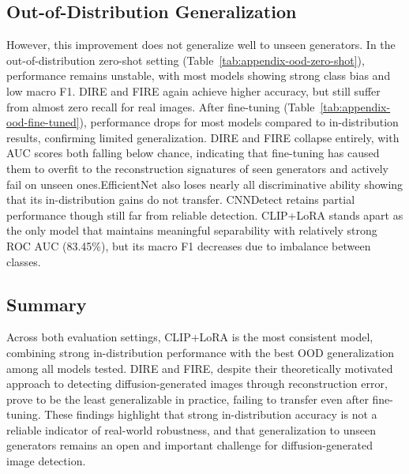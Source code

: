 \subsection{Out-of-Distribution Generalization}
However, this improvement does not generalize well to unseen generators. In the out-of-distribution zero-shot setting (Table~\ref{tab:appendix-ood-zero-shot}), performance remains unstable, with most models showing strong class bias and low macro F1. DIRE and FIRE again achieve higher accuracy, but still suffer from almost zero recall for real images. 
After fine-tuning (Table~\ref{tab:appendix-ood-fine-tuned}), performance drops for most models compared to in-distribution results, confirming limited generalization.
DIRE and FIRE collapse entirely, with AUC scores both falling below chance, indicating that fine-tuning has caused them to overfit to the reconstruction signatures of seen generators and actively fail on unseen ones.EfficientNet also loses nearly all discriminative ability showing that its in-distribution gains do not transfer.  CNNDetect retains partial performance though still far from reliable detection.
CLIP+LoRA stands apart as the only model that maintains meaningful separability with relatively strong ROC AUC (83.45\%), but its macro F1 decreases due to imbalance between classes. 

\subsection{Summary}
Across both evaluation settings, CLIP+LoRA is the most consistent model, combining strong in-distribution performance with the best OOD generalization among all models tested. DIRE and FIRE, despite their theoretically motivated approach to detecting diffusion-generated images through reconstruction error, prove to be the least generalizable in practice, failing to transfer even after fine-tuning. These findings highlight that strong in-distribution accuracy is not a reliable indicator of real-world robustness, and that generalization to unseen generators remains an open and important challenge for diffusion-generated image detection.
